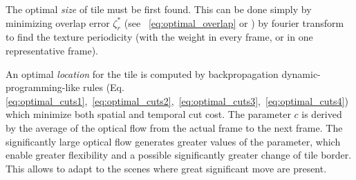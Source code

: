 		
		\hspace*{2mm}
		
		The optimal \emph{size} of tile must be first found.  This can be done simply by minimizing overlap error $\zeta_{r}^*$ (see ~\ref{eq:optimal_overlap} or \cite{HaiHat05}) by fourier transform \cite{HaiHat05GenRoll} to find the texture periodicity (with the weight in every frame, or in one representative frame).
	
		An optimal \emph{location} for the tile is computed by backpropagation  dynamic-programming-like rules (Eq. \ref{eq:optimal_cuts1},~\ref{eq:optimal_cuts2},~\ref{eq:optimal_cuts3},~\ref{eq:optimal_cuts4}) which minimize both spatial and temporal cut cost.  The parameter $c$ is derived by the average of the optical flow from the actual frame to the next frame. The significantly large optical flow generates greater values of the parameter, which enable greater flexibility and a possible significantly greater change of tile border. This allows to adapt to the scenes where great significant move are present. 
				

